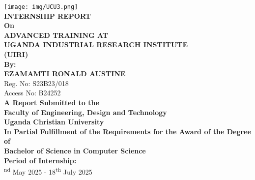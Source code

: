 \documentclass[12pt,a4paper]{report}
\begin{document}

\begin{titlepage}
    \centering
    \vspace*{-1cm}
    
    \texttt{[image: img/UCU3.png]}\\[1.5cm]
    
    {\fontsize{18}{21.6}\selectfont\bfseries INTERNSHIP REPORT}\\[0.5cm]
    
    {\fontsize{14}{16.8}\selectfont\bfseries On} \\[0.4cm]
    
    {\fontsize{16}{19.2}\selectfont\bfseries ADVANCED TRAINING AT}\\[0.3cm]
    {\fontsize{16}{19.2}\selectfont\bfseries UGANDA INDUSTRIAL RESEARCH INSTITUTE}\\[0.2cm]
    {\fontsize{16}{19.2}\selectfont\bfseries (UIRI)}\\[1cm]

    {\fontsize{14}{16.8}\selectfont\bfseries By:} \\[0.4cm]
    {\fontsize{16}{19.2}\selectfont\bfseries EZAMAMTI RONALD AUSTINE}\\[0.3cm]
    {\fontsize{14}{16.8}\selectfont Reg. No: S23B23/018}\\[0.2cm]
    {\fontsize{14}{16.8}\selectfont Access No: B24252}\\[1.2cm]

    {\fontsize{14}{16.8}\selectfont\bfseries A Report Submitted to the} \\[0.3cm]
    {\fontsize{14}{16.8}\selectfont\bfseries Faculty of Engineering, Design and Technology}\\[0.3cm]
    {\fontsize{14}{16.8}\selectfont\bfseries Uganda Christian University}\\[0.8cm]

    {\fontsize{12}{16.8}\selectfont\bfseries In Partial Fulfillment of the Requirements for the Award of the Degree of} \\[0.3cm]
    {\fontsize{12}{16.8}\selectfont\bfseries Bachelor of Science in Computer Science}\\[0.7cm]

    {\fontsize{14}{16.8}\selectfont\bfseries Period of Internship:} \\[0.3cm]
    {\fontsize{12}{16.8}\textsuperscript{nd} May 2025 - 18\textsuperscript{th} July 2025}
\end{titlepage}
\end{document}
